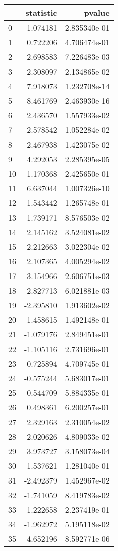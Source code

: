 \begin{tabular}{lrr}
\toprule
{} &  statistic &        pvalue \\
\midrule
0  &   1.074181 &  2.835340e-01 \\
1  &   0.722206 &  4.706474e-01 \\
2  &   2.698583 &  7.226483e-03 \\
3  &   2.308097 &  2.134865e-02 \\
4  &   7.918073 &  1.232708e-14 \\
5  &   8.461769 &  2.463930e-16 \\
6  &   2.436570 &  1.557933e-02 \\
7  &   2.578542 &  1.052284e-02 \\
8  &   2.467938 &  1.423075e-02 \\
9  &   4.292053 &  2.285395e-05 \\
10 &   1.170368 &  2.425650e-01 \\
11 &   6.637044 &  1.007326e-10 \\
12 &   1.543442 &  1.265748e-01 \\
13 &   1.739171 &  8.576503e-02 \\
14 &   2.145162 &  3.524081e-02 \\
15 &   2.212663 &  3.022304e-02 \\
16 &   2.107365 &  4.005294e-02 \\
17 &   3.154966 &  2.606751e-03 \\
18 &  -2.827713 &  6.021881e-03 \\
19 &  -2.395810 &  1.913602e-02 \\
20 &  -1.458615 &  1.492148e-01 \\
21 &  -1.079176 &  2.849451e-01 \\
22 &  -1.105116 &  2.731696e-01 \\
23 &   0.725894 &  4.709745e-01 \\
24 &  -0.575244 &  5.683017e-01 \\
25 &  -0.544709 &  5.884335e-01 \\
26 &   0.498361 &  6.200257e-01 \\
27 &   2.329163 &  2.310054e-02 \\
28 &   2.020626 &  4.809033e-02 \\
29 &   3.973727 &  3.158073e-04 \\
30 &  -1.537621 &  1.281040e-01 \\
31 &  -2.492379 &  1.452967e-02 \\
32 &  -1.741059 &  8.419783e-02 \\
33 &  -1.222658 &  2.237419e-01 \\
34 &  -1.962972 &  5.195118e-02 \\
35 &  -4.652196 &  8.592771e-06 \\
\bottomrule
\end{tabular}
